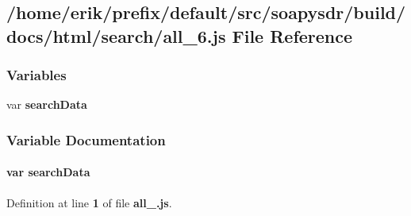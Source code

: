 \subsection{/home/erik/prefix/default/src/soapysdr/build/docs/html/search/all\+\_\+6.js File Reference}
\label{all__6_8js}
\subsubsection*{Variables}
\begin{DoxyCompactItemize}
\item 
var {\bf search\+Data}
\end{DoxyCompactItemize}


\subsubsection{Variable Documentation}
\paragraph[{search\+Data}]{\setlength{\rightskip}{0pt plus 5cm}var search\+Data}\label{all__6_8js_ad01a7523f103d6242ef9b0451861231e}


Definition at line {\bf 1} of file {\bf all\+\_.\+js}.

